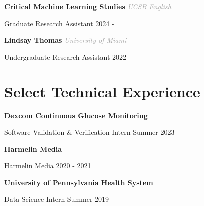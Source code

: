 \documentclass[a4paper,10pt]{article}
\begin{document}
\textbf{Critical Machine Learning Studies} \hspace{0.2cm} \textcolor{darkgray}{\textit{UCSB English}} \hfill  

Graduate Research Assistant \hfill 2024 - 

\textbf{Lindsay Thomas} \hspace{0.2cm} \textcolor{darkgray}{\textit{University of Miami}} \hfill  

Undergraduate Research Assistant \hfill 2022 


\section*{Select Technical Experience}

\textbf{Dexcom Continuous Glucose Monitoring} \hfill  

Software Validation \& Verification Intern \hfill Summer 2023 

\textbf{Harmelin Media} \hfill  

Harmelin Media \hfill 2020 - 2021 

\textbf{University of Pennsylvania Health System} \hfill  

Data Science Intern \hfill Summer 2019 
\end{document}

